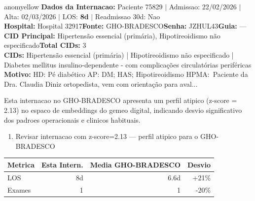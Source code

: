 \documentclass[a4paper,10pt]{article}
\begin{document}
\begin{anomalycard}[Internacao 118019 | GHO-BRADESCO | MODERADO (z=2.13)]{anomyellow}
\textbf{Dados da Internacao:} Paciente 75829 $\mid$ Admissao: 22/02/2026 $\mid$ Alta: 02/03/2026 $\mid$ LOS: \textbf{8d} $\mid$ Readmissao 30d: Nao\\
\textbf{Hospital:} Hospital 32917\quad\textbf{Fonte:} GHO-BRADESCO\quad\textbf{Senha:} JZHUL43\quad\textbf{Guia:} ---\\
\textbf{CID Principal:} {\small Hipertensão essencial (primária), Hipotireoidismo não especificado}\quad\textbf{Total CIDs:} 3\\

\textbf{CIDs:} {\scriptsize Hipertensão essencial (primária) | Hipotireoidismo não especificado | Diabetes mellitus insulino-dependente - com complicações circulatórias periféricas}\\

\textbf{Motivo:} {\scriptsize HD: Pé diabético  AP: DM; HAS; Hipotireoidismo  HPMA: Paciente da Dra. Claudia Diniz ortopedista, vem com orientação para aval...}\\

\vspace{2pt}\begin{tcolorbox}[colback=severityred!20,colframe=anomyellow,title={\textbf{Interpretacao de Negocio}},fonttitle=\bfseries\small,left=4pt,right=4pt,top=3pt,bottom=3pt]
{\small Esta internacao no GHO-BRADESCO apresenta um perfil atipico (z-score = 2.13) no espaco de embeddings do gemeo digital, indicando desvio significativo dos padroes operacionais e clinicos habituais.}
\end{tcolorbox}
\begin{tcolorbox}[colback=severityyellow!30,colframe=anomorange,title={\textbf{Recomendacoes Especificas}},fonttitle=\bfseries\small,left=4pt,right=4pt,top=3pt,bottom=3pt]
\begin{enumerate}[nosep,leftmargin=16pt]
\item {\small Revisar internacao com z-score=2.13 --- perfil atipico para o GHO-BRADESCO}
\end{enumerate}
\end{tcolorbox}
\begin{center}\begin{tabular}{l r r r}\toprule\textbf{Metrica} & \textbf{Esta Intern.} & \textbf{Media GHO-BRADESCO} & \textbf{Desvio} \\\midrule
LOS & 8d & 6.6d & +21\% \\
Exames & 1 & 1 & -20\% \\
\bottomrule\end{tabular}\end{center}


\end{anomalycard}
\end{document}
